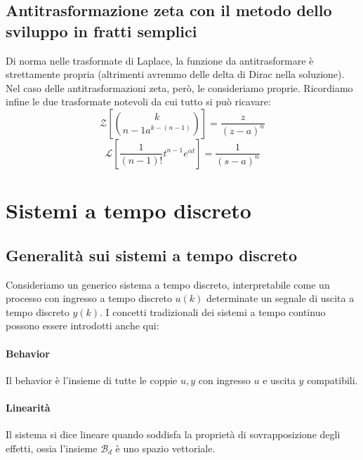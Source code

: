 \documentclass[11pt]{article}
\newcommand{\trz}{\mathcal{Z}}
\begin{document}
\subsection{Antitrasformazione zeta con il metodo dello sviluppo in fratti semplici}
Di norma nelle trasformate di Laplace, la funzione da antitrasformare è strettamente propria (altrimenti avremmo delle delta di Dirac nella soluzione). Nel caso delle antitrasformazioni zeta, però, le consideriamo proprie.
Ricordiamo infine le due trasformate notevoli da cui tutto si può ricavare:
\begin{displaymath}
    \trz\left[{k}\choose{n-1}a^{k-(n-1)}\right] = \frac{z}{(z-a)^n}
\end{displaymath}
\begin{displaymath}
    \mathcal{L}\left[\frac{1}{(n-1)!}t^{n-1}e^{\alpha t}\right] = \frac{1}{(s-a)^n}
\end{displaymath}
\section{Sistemi a tempo discreto}
\subsection{Generalità sui sistemi a tempo discreto}
Consideriamo un generico sistema a tempo discreto, interpretabile come un processo con ingresso a tempo discreto $u(k)$ determinate un segnale di uscita a tempo discreto $y(k)$.
I concetti tradizionali dei sistemi a tempo continuo possono essere introdotti anche qui:
\paragraph{Behavior}
Il behavior è l'insieme di tutte le coppie $u,y$ con ingresso $u$ e uscita $y$ compatibili.
\paragraph{Linearità}
Il sistema si dice lineare quando soddisfa la proprietà di sovrapposizione degli effetti, ossia l'insieme $\mathcal{B}_d$ è uno spazio vettoriale.
\end{document}
